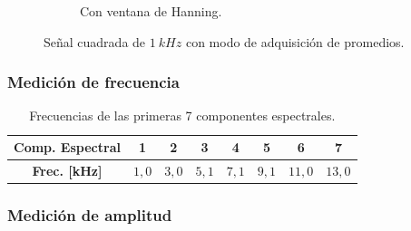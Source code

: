 \begin{figure}[H]
\begin{subfigure}[H]{0.40\textwidth}
        \caption{Con ventana de Hanning.}
      \end{subfigure}

      \caption{Señal cuadrada de $1~kHz$ con modo de adquisición de promedios.}
      \label{fig:SeñalCuadModoPromedio}
    \end{figure}

    
    \subsubsection{Medición de frecuencia}

      \begin{table}[H]
        \centering
      \begin{tabular}{cccccccc} \hline \hline
        \textbf{Comp. Espectral}  &  \textbf{1}  &  \textbf{2}  & \textbf{3}  & \textbf{4} & \textbf{5}  & \textbf{6}  &  \textbf{7}\\ \hline
        \textbf{Frec. [kHz]}   &   $1,0$   &    $3,0$   &   $5,1$  &  $7,1$  &  $9,1$  &  $11,0$  &  $13,0$\\ \hline \hline
        \end{tabular}
        \caption{Frecuencias de las primeras 7 componentes espectrales.}
        \label{tab:ComponentesEspectrExp1}
      \end{table}


    \subsubsection{Medición de amplitud}


